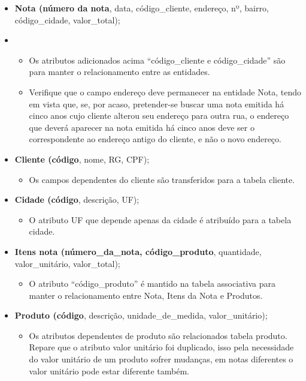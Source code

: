 \documentclass{article}
\begin{document}
\begin{itemize}
    \item \textbf{Nota (número da nota}, data, código\_cliente, endereço, nº, bairro, código\_cidade, valor\_total);
        \item \begin{itemize}
            \item Os atributos adicionados acima “código\_cliente e código\_cidade” são para manter o relacionamento entre as entidades.
            \item Verifique que o campo endereço deve permanecer na entidade Nota, tendo em vista que, se, por acaso, pretender-se buscar uma nota emitida há cinco anos cujo cliente alterou seu endereço para outra rua, o endereço que deverá aparecer na nota emitida há cinco anos deve ser o correspondente ao endereço antigo do cliente, e não o novo endereço.
        \end{itemize}
    \item \textbf{Cliente (código}, nome, RG, CPF);
        \begin{itemize}
            \item Os campos dependentes do cliente são transferidos para a tabela cliente.
        \end{itemize}
    \item \textbf{Cidade (código}, descrição, UF);
        \begin{itemize}
            \item O atributo UF que depende apenas da cidade é atribuído para a tabela cidade.
        \end{itemize}
    \item \textbf{Itens nota (número\_da\_nota, código\_produto}, quantidade, valor\_unitário, valor\_total);
        \begin{itemize}
            \item O atributo “código\_produto” é mantido na tabela associativa para manter o relacionamento entre Nota, Itens da Nota e Produtos.
        \end{itemize}
    \item \textbf{Produto (código}, descrição, unidade\_de\_medida, valor\_unitário);
        \begin{itemize}
            \item Os atributos dependentes de produto são relacionados tabela produto. Repare que o atributo valor unitário foi duplicado, isso pela necessidade do valor unitário de um produto sofrer mudanças, em notas diferentes o valor unitário pode estar diferente também.
        \end{itemize}
\end{itemize}
\end{document}
